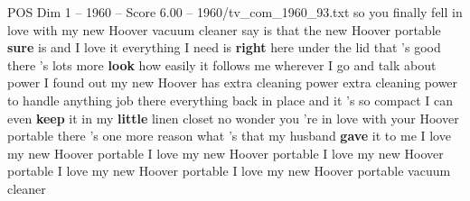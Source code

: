 \begin{textsample}{POS Dim 1 – 1960 – Score 6.00 – 1960/tv\_com\_1960\_93.txt}  \label{ex:f1_pos_029}
so you finally fell in love with my new Hoover vacuum cleaner say is that the new Hoover portable \textbf{sure} is and I love it everything I need is \textbf{right} here under the lid that 's good there 's lots more \textbf{look} how easily it follows me wherever I go and talk about power I found out my new Hoover has extra cleaning power extra cleaning power to handle anything job there everything back in place and it 's so compact I can even \textbf{keep} it in my \textbf{little} linen closet no wonder you 're in love with your Hoover portable there 's one more reason what 's that my husband \textbf{gave} it to me I love my new Hoover portable I love my new Hoover portable I love my new Hoover portable I love my new Hoover portable I love my new Hoover portable vacuum cleaner

\end{textsample}
